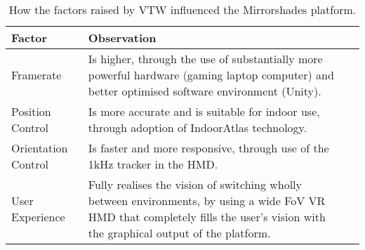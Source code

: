 \begin{table}[h]
\begin{center}
\begin{tabularx}{\textwidth}{l *{2}{>{\centering\arraybackslash}X}}

\toprule

\textbf{Factor} & \textbf{Observation} \\

\midrule

		
Framerate & Is higher, through the use of substantially more powerful hardware (gaming laptop computer) and better optimised software environment (Unity). \\

\midrule


Position Control & Is more accurate and is suitable for indoor use, through adoption of IndoorAtlas technology. \\

\midrule


Orientation Control & Is faster and more responsive, through use of the 1kHz tracker in the HMD. \\

\midrule


User Experience & Fully realises the vision of switching wholly between environments, by using a wide FoV VR HMD that completely fills the user's vision with the graphical output of the platform. \\

\bottomrule
\end{tabularx}
\end{center}
\caption{How the factors raised by VTW influenced the Mirrorshades platform.}
\label{influence-factors-mirrorshades-table}
\end{table}

